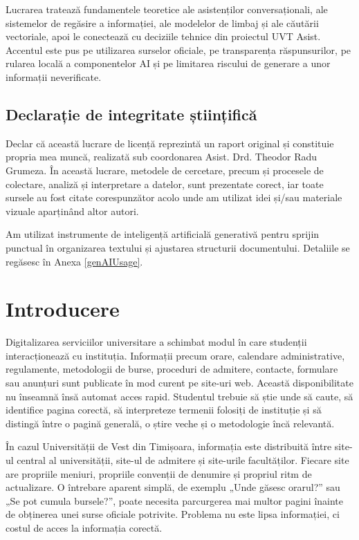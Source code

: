 \documentclass[12pt,a4paper]{report}
\theoremstyle{definition}
\theoremstyle{remark}
\newcommand{\coordinatorname}{Asist. Drd. Theodor Radu Grumeza}
\begin{document}
Lucrarea tratează fundamentele teoretice ale asistenților conversaționali, ale sistemelor de regăsire a informației, ale modelelor de limbaj și ale căutării vectoriale, apoi le conectează cu deciziile tehnice din proiectul UVT Asist. Accentul este pus pe utilizarea surselor oficiale, pe transparența răspunsurilor, pe rularea locală a componentelor AI și pe limitarea riscului de generare a unor informații neverificate.

\newpage
\section*{Declarație de integritate științifică}
Declar că această lucrare de licență reprezintă un raport original și constituie propria mea muncă, realizată sub coordonarea \coordinatorname. În această lucrare, metodele de cercetare, precum și procesele de colectare, analiză și interpretare a datelor, sunt prezentate corect, iar toate sursele au fost citate corespunzător acolo unde am utilizat idei și/sau materiale vizuale aparținând altor autori.

Am utilizat instrumente de inteligență artificială generativă pentru sprijin punctual în organizarea textului și ajustarea structurii documentului. Detaliile se regăsesc în Anexa \ref{genAIUsage}.

\newpage
\tableofcontents
\newpage

\chapter{Introducere}

Digitalizarea serviciilor universitare a schimbat modul în care studenții interacționează cu instituția. Informații precum orare, calendare administrative, regulamente, metodologii de burse, proceduri de admitere, contacte, formulare sau anunțuri sunt publicate în mod curent pe site-uri web. Această disponibilitate nu înseamnă însă automat acces rapid. Studentul trebuie să știe unde să caute, să identifice pagina corectă, să interpreteze termenii folosiți de instituție și să distingă între o pagină generală, o știre veche și o metodologie încă relevantă.

În cazul Universității de Vest din Timișoara, informația este distribuită între site-ul central al universității, site-ul de admitere și site-urile facultăților. Fiecare site are propriile meniuri, propriile convenții de denumire și propriul ritm de actualizare. O întrebare aparent simplă, de exemplu „Unde găsesc orarul?” sau „Se pot cumula bursele?”, poate necesita parcurgerea mai multor pagini înainte de obținerea unei surse oficiale potrivite. Problema nu este lipsa informației, ci costul de acces la informația corectă.
\end{document}
